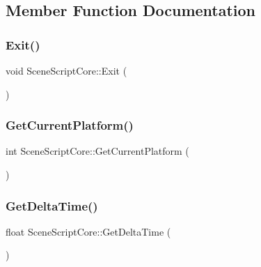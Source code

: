 \subsection{Member Function Documentation}
\hypertarget{class_scene_script_core_aff27ddeada912041d55a4f18c4c6a4e4}{}\label{class_scene_script_core_aff27ddeada912041d55a4f18c4c6a4e4} 
\subsubsection{\texorpdfstring{Exit()}{Exit()}}
{\footnotesize\ttfamily void Scene\+Script\+Core\+::\+Exit (\begin{DoxyParamCaption}{ }\end{DoxyParamCaption})}

\hypertarget{class_scene_script_core_a7866b353e904c0f3935d28e625451f82}{}\label{class_scene_script_core_a7866b353e904c0f3935d28e625451f82} 
\subsubsection{\texorpdfstring{Get\+Current\+Platform()}{GetCurrentPlatform()}}
{\footnotesize\ttfamily int Scene\+Script\+Core\+::\+Get\+Current\+Platform (\begin{DoxyParamCaption}{ }\end{DoxyParamCaption})}

\hypertarget{class_scene_script_core_af943a6a3b9ff21a869f2ba42d6cc288b}{}\label{class_scene_script_core_af943a6a3b9ff21a869f2ba42d6cc288b} 
\subsubsection{\texorpdfstring{Get\+Delta\+Time()}{GetDeltaTime()}}
{\footnotesize\ttfamily float Scene\+Script\+Core\+::\+Get\+Delta\+Time (\begin{DoxyParamCaption}{ }\end{DoxyParamCaption})}

\hypertarget{class_scene_script_core_ab36d363b006cc650c3733c46ef6d3c48}{}\label{class_scene_script_core_ab36d363b006cc650c3733c46ef6d3c48} 
